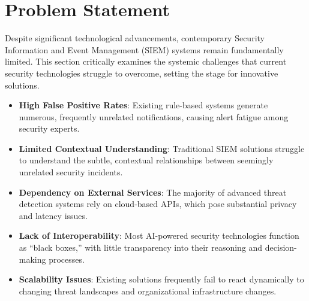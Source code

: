 \section{Problem Statement}
\label{sec_problem_statement}

Despite significant technological advancements, contemporary Security Information and Event Management (SIEM) systems remain fundamentally limited. This section critically examines the systemic challenges that current security technologies struggle to overcome, setting the stage for innovative solutions.

\begin{itemize}
    \item \textbf{High False Positive Rates}: Existing rule-based systems generate numerous, frequently unrelated notifications, causing alert fatigue among security experts.
    \item \textbf{Limited Contextual Understanding}: Traditional SIEM solutions struggle to understand the subtle, contextual relationships between seemingly unrelated security incidents.
    \item \textbf{Dependency on External Services}: The majority of advanced threat detection systems rely on cloud-based APIs, which pose substantial privacy and latency issues.
    \item \textbf{Lack of Interoperability}: Most AI-powered security technologies function as ``black boxes,'' with little transparency into their reasoning and decision-making processes.
    \item \textbf{Scalability Issues}: Existing solutions frequently fail to react dynamically to changing threat landscapes and organizational infrastructure changes.
\end{itemize}
